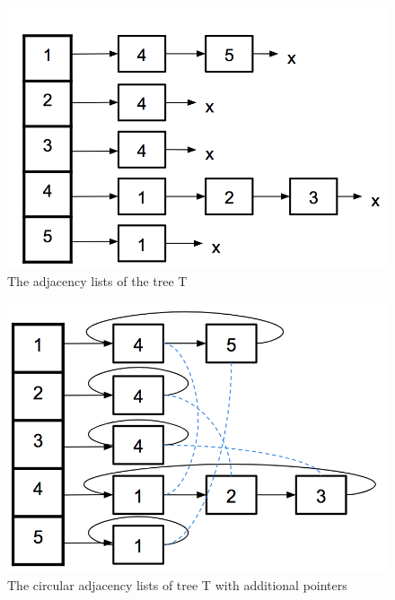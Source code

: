 \documentclass[twoside]{article}
\begin{document}
\begin{figure}[!ht]
\centering
\includegraphics[scale=0.4]{img/EulerCkt2.png}
\caption{The adjacency lists of the tree T} \label{fig:euler2} 
\end{figure}

\begin{figure}[!ht]
\centering
\includegraphics[scale=0.4]{img/Euler3.png}
\caption{The circular adjacency lists of tree T with additional pointers} \label{fig:euler3} 
\end{figure}
\end{document}
